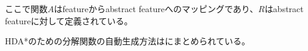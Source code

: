 ここで関数$A$はfeatureからabstract featureへのマッピングであり、$R$はabstract featureに対して定義されている。

HDA*のための分解関数の自動生成方法は\cite{jinnai2017work}にまとめられている。

% 
% 


